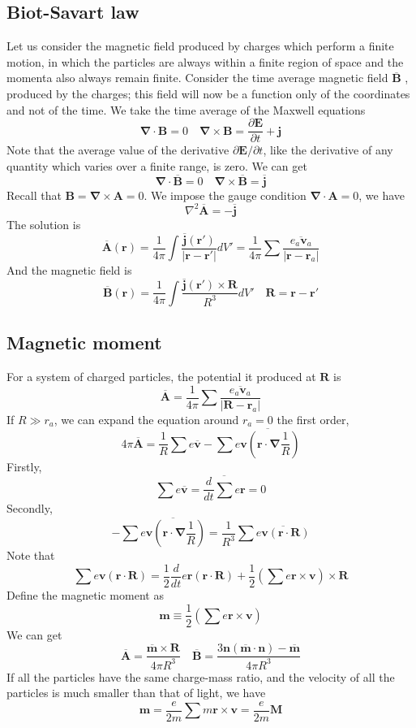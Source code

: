 \documentclass[cyan]{elegantnote}
\begin{document}
\subsection{Biot-Savart law}
Let us consider the magnetic field produced by charges which perform a finite motion, in which the particles are always within a finite region of space and the momenta also always remain finite. Consider the time average magnetic field $\overline{\bm{B}}$ , produced by the charges; this field will now be a function only of the coordinates and not of the time. We take the time average of the Maxwell equations
\[\bm{\nabla} \cdot \bm{B} = 0 \quad \bm{\nabla} \times \bm{B} = \frac{\partial \bm{E}}{\partial t} + \bm{j}\] 
Note that the average value of the derivative $\partial \bm{E} / \partial t$, like the derivative of any quantity which varies over a finite range, is zero. We can get
\[\bm{\nabla} \cdot \overline{\bm{B}} = 0 \quad \bm{\nabla} \times \overline{\bm{B}} =  \overline{\bm{j}}\]
Recall that $\bm{B} = \bm{\nabla} \times \bm{A} = 0$. We impose the gauge condition $\bm{\nabla} \cdot \bm{A} = 0$, we have
\[\nabla^2 \overline{\bm{A}} = - \overline{\bm{j}}\]
The solution is
\[\overline{\bm{A}}(\bm{r}) = \frac{1}{4\pi} \int \frac{\overline{\bm{j}}(\bm{r}')}{|\bm{r}-\bm{r}'|} dV' = \frac{1}{4\pi} \sum \overline{\frac{e_a \bm{v}_a}{|\bm{r}-\bm{r}_a|}}\]
And the magnetic field is
\[\overline{\bm{B}}(\bm{r}) = \frac{1}{4\pi} \int \frac{\overline{\bm{j}}(\bm{r}') \times \bm{R}}{R^3} dV' \quad \bm{R} = \bm{r}-\bm{r}'\]

\subsection{Magnetic moment}
For a system of charged particles, the potential it produced at $\bm{R}$ is
\[\overline{\bm{A}} = \frac{1}{4\pi} \sum \overline{\frac{e_a \bm{v}_a}{|\bm{R}-\bm{r}_a|}}\]
If $R \gg r_a$, we can expand the equation around $r_a=0$ the first order,
\[4\pi \overline{\bm{A}} = \frac{1}{R} \sum e \overline{\bm{v}} - \sum \overline{e \bm{v} \left( \bm{r} \cdot \bm{\nabla} \frac{1}{R}\right)}\]
Firstly,
\[\sum e \overline{\bm{v}} = \overline{\frac{d}{dt} \sum e \bm{r}} = 0\]
Secondly,
\[-\sum \overline{e \bm{v} \left( \bm{r} \cdot \bm{\nabla} \frac{1}{R}\right)} = \frac{1}{R^3} \sum \overline{e\bm{v} (\bm{r} \cdot \bm{R})}\]
Note that
\[\sum e\bm{v} (\bm{r} \cdot \bm{R}) = \frac{1}{2} \frac{d}{dt} e\bm{r}(\bm{r}\cdot\bm{R}) + \frac{1}{2} \left(\sum e \bm{r} \times \bm{v}\right) \times \bm{R}\]
Define the magnetic moment as
\[\bm{m} \equiv \frac{1}{2} \left(\sum e \bm{r} \times \bm{v}\right)\]
We can get
\[\overline{\bm{A}} = \frac{\overline{\bm{m}} \times \bm{R}}{4\pi R^3} \quad \overline{\bm{B}} = \frac{3\bm{n}(\overline{\bm{m}} \cdot \bm{n})-\overline{\bm{m}}}{4\pi R^3}\]
If all the particles have the same charge-mass ratio, and the velocity of all the particles is much smaller than that of light, we have
\[\bm{m} = \frac{e}{2m} \sum m \bm{r} \times \bm{v} = \frac{e}{2m} \bm{M}\]
\end{document}
